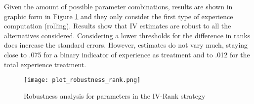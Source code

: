 Given the amount of possible parameter combinations, results are shown in graphic form in Figure \ref{fig:plot_robustness_rank} and they only consider the first type of experience computation (rolling). Results show that IV estimates are robust to all the alternatives considered. Considering a lower thresholds for the difference in ranks does increase the standard errors. However, estimates do not vary much, staying close to .075 for a binary indicator of experience as treatment and to .012 for the total experience treatment.

\begin{figure}[h]
  \texttt{[image: plot\_robustness\_rank.png]}
  \caption{Robustness analysis for parameters in the IV-Rank strategy}
  \label{fig:plot_robustness_rank}
\end{figure}
